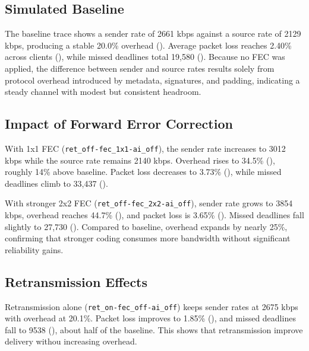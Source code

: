 \subsection{Simulated Baseline}

\quad The baseline trace shows a sender rate of 2661 kbps against a source rate of 2129 kbps, producing a stable 20.0\% overhead (\textbf{}). Average packet loss reaches 2.40\% across clients (\textbf{}), while missed deadlines total 19,580 (\textbf{}). Because no FEC was applied, the difference between sender and source rates results solely from protocol overhead introduced by metadata, signatures, and padding, indicating a steady channel with modest but consistent headroom.

\subsection{Impact of Forward Error Correction}

\quad With 1x1 FEC (\texttt{ret\_off-fec\_1x1-ai\_off}), the sender rate increases to 3012 kbps while the source rate remains 2140 kbps. Overhead rises to 34.5\% (\textbf{}), roughly 14\% above baseline. Packet loss decreases to 3.73\% (\textbf{}), while missed deadlines climb to 33,437 (\textbf{}).

\quad With stronger 2x2 FEC (\texttt{ret\_off-fec\_2x2-ai\_off}), sender rate grows to 3854 kbps, overhead reaches 44.7\% (\textbf{}), and packet loss is 3.65\% (\textbf{}). Missed deadlines fall slightly to 27,730 (\textbf{}). Compared to baseline, overhead expands by nearly 25\%, confirming that stronger coding consumes more bandwidth without significant reliability gains.  


\subsection{Retransmission Effects}

\quad Retransmission alone (\texttt{ret\_on-fec\_off-ai\_off}) keeps sender rates at 2675 kbps with overhead at 20.1\%. Packet loss improves to 1.85\% (\textbf{}), and missed deadlines fall to 9538 (\textbf{}), about half of the baseline. This shows that retransmission improve delivery withou increasing overhead.  

